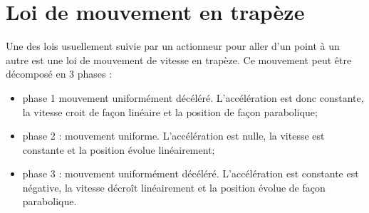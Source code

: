 %
%
%
%
%
%
\section{Loi de mouvement en trapèze}




Une des lois usuellement suivie par un actionneur pour aller d'un point à un autre est une loi de mouvement de vitesse en trapèze.  Ce mouvement peut être décomposé en 3 phases : 
\begin{itemize}
\item phase 1 mouvement uniformément décéléré. L'accélération est donc constante, la vitesse croit de façon linéaire et la position de façon parabolique;
\item phase 2 : mouvement uniforme. L'accélération est nulle, la vitesse est constante et la position évolue linéairement;
\item phase 3 : mouvement uniformément décéléré. L'accélération est constante est négative, la vitesse décroît linéairement et la position évolue de façon parabolique. 
\end{itemize}

